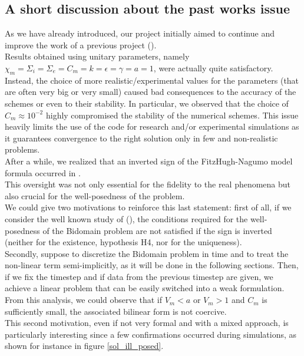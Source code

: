 \documentclass[a4paper,11pt]{article}
\begin{document}
    \subsection{A short discussion about the past works issue}
    As we have already introduced, our project initially aimed to continue and improve the work of a previous project (\parencite{marta}). \\
    Results obtained using unitary parameters, namely $\chi_m =\Sigma_i= \Sigma_e= C_m= k = \epsilon= \gamma= a=1$, were actually quite satisfactory. Instead, the choice of more realistic/experimental values for the parameters (that are often very big or very small) caused bad consequences to the accuracy of the schemes or even to their stability. In particular, we observed that the choice of $C_m \approx 10^{-2}$ highly compromised the stability of the numerical schemes.
    This issue heavily limits the use of the code for research and/or experimental simulations as it guarantees convergence to the right solution only in few and non-realistic problems.  \\

    \noindent After a while, we realized that an inverted sign of the FitzHugh-Nagumo model formula occurred in \cite{acta}. \\

    \noindent This oversight was not only essential for the fidelity to the real phenomena but also crucial for the well-posedness of the problem.\\ 
    We could give two motivations to reinforce this last statement: first of all, if we consider the well known study of \citeauthor{bourgault} (\cite{bourgault}), the conditions required for the well-posedness of the Bidomain problem are not satisfied if the sign is inverted (neither for the existence, hypothesis H4, nor for the uniqueness).\\ Secondly, suppose to discretize the Bidomain problem in time and to treat the non-linear term semi-implicitly, as it will be done in the following sections. Then, if we fix the timestep and if data from the previous timestep are given, we achieve a linear problem that can be easily switched into a weak formulation. From this analysis, we could observe that if $V_m<a$ or $V_m>1$ and $C_m$ is sufficiently small, the associated bilinear form is not coercive. \\

    \noindent This second motivation, even if not very formal and with a mixed approach, is particularly interesting since a few confirmations occurred during simulations, as shown for instance in figure \ref{sol_ill_posed}.
\end{document}
